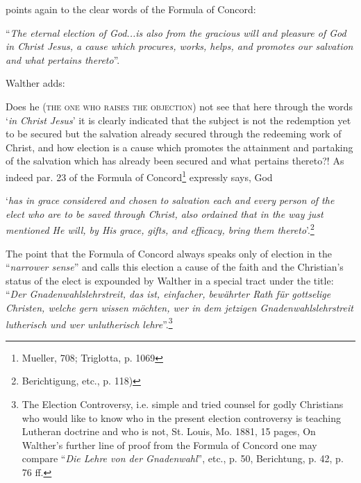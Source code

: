 points again to the clear words of the Formula of Concord: \begin{displayquote}“\textit{The eternal election of God...is also from the gracious will and pleasure of God in Christ Jesus, a cause which procures, works, helps, and promotes our salvation and what pertains thereto}”.\end{displayquote}  Walther adds: \begin{fancyquotes}Does he {\scriptsize\textsc{(the one who raises the objection)}} not see that here through the words ‘\textit{in Christ Jesus}’ it is clearly indicated that the subject is not the redemption yet to be secured but the salvation already secured through the redeeming work of Christ, and how election is a cause which promotes the attainment and partaking of the salvation which has already been secured and what pertains thereto?!  As indeed par. 23 of the Formula of Concord\footnote{Mueller, 708; Triglotta, p. 1069} expressly says, God \begin{displayquote}‘\textit{has in grace considered and chosen to salvation each and every person of the elect who are to be saved through Christ, also ordained that in the way just mentioned He will, by His grace, gifts, and efficacy, bring them thereto}’.\footnote{Berichtigung, etc., p. 118)}\end{displayquote}\end{fancyquotes}  The point that the Formula of Concord always speaks only of election in the “\textit{narrower sense}” and calls this election a cause of the faith and the Christian’s status of the elect is expounded by Walther in a special tract under the title: “\textit{Der Gnadenwahlslehrstreit, das ist, einfacher, bewährter Rath für gottselige Christen, welche gern wissen möchten, wer in dem jetzigen Gnadenwahlslehrstreit lutherisch und wer unlutherisch lehre}”.\footnote{The Election Controversy, i.e. simple and tried counsel for godly Christians who would like to know who in the present election controversy is teaching Lutheran doctrine and who is not, St. Louis, Mo. 1881, 15 pages, On Walther’s further line of proof from the Formula of Concord one may compare “\textit{Die Lehre von der Gnadenwahl}”, etc., p. 50, Berichtung, p. 42, p. 76 ff.}

